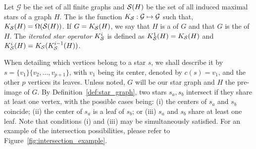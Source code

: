 \begin{definition}\label{def:star_graph}
    Let $\mathcal{G}$ be the set of all finite graphs and $\mathcal{S}(H)$ be the set of all induced maximal stars of a graph $H$. The  is the function $K_{\mathcal{S}} : \mathcal{G} \mapsto \mathcal{G}$ such that, $K_{\mathcal{S}}(H) = \Omega(\mathcal{S}(H))$.
    If $G = K_{\mathcal{S}}(H)$, we say that $H$ is a  of $G$ and that $G$ is the  of $H$.
    The \textit{iterated star operator} $K_{\mathcal{S}}^i$ is defined as $K_{\mathcal{S}}^1(H) = K_{\mathcal{S}}(H)$ and $K_{\mathcal{S}}^i(H) = K_{\mathcal{S}}(K_{\mathcal{S}}^{i-1}(H))$.
\end{definition}

When detailing which vertices belong to a star $s$, we shall describe it by $s = \{v_1\}\{v_2, \dots, v_{p+1}\}$, with $v_1$ being its center, denoted by $c(s) = v_1$, and the other $p$ vertices its leaves.
Unless noted, $G$ will be our star graph and $H$ the pre-image of $G$. %
By Definition~\ref{def:star_graph}, two stars $s_a,s_b$ intersect if they share at least one vertex, with the possible cases being: (i) the centers of $s_a$ and $s_b$ coincide; (ii) the center of $s_a$ is a leaf of $s_b$; or (iii) $s_a$ and $s_b$ share at least one leaf.
Note that conditions (i) and (iii) may be simultaneously satisfied.
For an example of the intersection possibilities, please refer to Figure~\ref{fig:intersection_example}.


